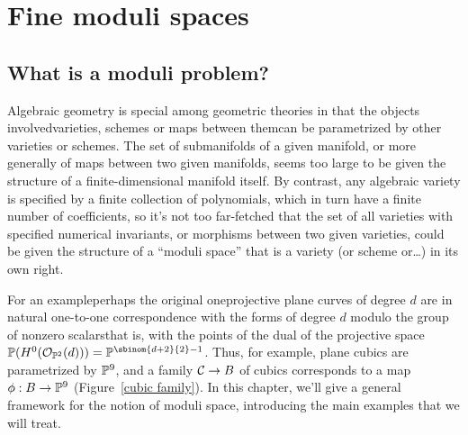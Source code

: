 
\chapter{Fine moduli spaces}
\label{Moduli chapter}
\label{ModuliChapter}

\section{What is a moduli problem?}

Algebraic geometry is special among geometric theories in
that
the objects involved\emdash varieties,  schemes or maps between
them\emdash can be parametrized by other varieties or schemes. The set
of submanifolds of a given manifold, or more generally of maps between
two given manifolds, seems too large to be given the structure of a
finite-dimensional manifold itself. By contrast, any algebraic variety
is specified by a finite collection of polynomials, which in turn have
a finite number of coefficients, so it's not too far-fetched that the
set of all varieties with specified numerical invariants, or
morphisms between two given varieties, could be given the structure of
a ``moduli space'' that is a variety (or scheme or\dots) in its own
right.

For an example\emdash perhaps the original one\emdash projective plane
curves of degree $d$
are in natural one-to-one correspondence with the forms of degree $d$
modulo the group of nonzero scalars\emdash that is, with the points of
the dual of the projective space
$ \PP(H^0(\sO_{\PP^2}(d)))=\PP^{\sbinom{d+2}{2}-1} $.
Thus, for example, plane cubics are parametrized by ${\mathbb P}^{9}$, and a
family $\mathcal C \to B$ of cubics corresponds to a map $\phi: B \to {\mathbb P}^9$
(Figure~\ref{cubic family}).
In this chapter, we'll give a general framework for the notion of moduli
space, introducing the main examples that we will treat.

